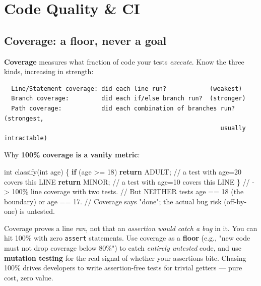\documentclass[11pt]{article}
\newenvironment{Shaded}{\begin{snugshade}}{\end{snugshade}}
\newcommand{\CommentTok}[1]{\textcolor[rgb]{0.48,0.49,0.49}{#1}}
\newcommand{\ControlFlowTok}[1]{\textcolor[rgb]{0.99,0.74,0.29}{\textbf{#1}}}
\newcommand{\DataTypeTok}[1]{\textcolor[rgb]{0.16,0.50,0.73}{#1}}
\newcommand{\DecValTok}[1]{\textcolor[rgb]{0.96,0.45,0.00}{#1}}
\newcommand{\FunctionTok}[1]{\textcolor[rgb]{0.56,0.27,0.68}{#1}}
\newcommand{\NormalTok}[1]{\textcolor[rgb]{0.81,0.81,0.76}{#1}}
\newcommand{\OperatorTok}[1]{\textcolor[rgb]{0.81,0.81,0.76}{#1}}
\begin{document}
\section{Code Quality \& CI}\label{code-quality--ci}

\subsection{Coverage: a floor, never a goal}\label{coverage-a-floor-never-a-goal}

\textbf{Coverage} measures what fraction of code your tests \emph{execute}. Know the three kinds, increasing in strength:

\setcodelang{}

\begin{verbatim}
  Line/Statement coverage: did each line run?            (weakest)
  Branch coverage:         did each if/else branch run?  (stronger)
  Path coverage:           did each combination of branches run?  (strongest,
                                                            usually intractable)
\end{verbatim}

Why \textbf{100\% coverage is a vanity metric}:


\begin{Shaded}
\begin{Highlighting}[]
\DataTypeTok{int} \FunctionTok{classify}\OperatorTok{(}\DataTypeTok{int}\NormalTok{ age}\OperatorTok{)} \OperatorTok{\{}
    \ControlFlowTok{if} \OperatorTok{(}\NormalTok{age }\OperatorTok{\textgreater{}=} \DecValTok{18}\OperatorTok{)} \ControlFlowTok{return}\NormalTok{ ADULT}\OperatorTok{;}     \CommentTok{// a test with age=20 covers this LINE}
    \ControlFlowTok{return}\NormalTok{ MINOR}\OperatorTok{;}                    \CommentTok{// a test with age=10 covers this LINE}
\OperatorTok{\}}
\CommentTok{// {-}\textgreater{} 100\% line coverage with two tests.}
\CommentTok{// But NEITHER tests age == 18 (the boundary) or age == 17.}
\CommentTok{// Coverage says "done"; the actual bug risk (off{-}by{-}one) is untested.}
\end{Highlighting}
\end{Shaded}

Coverage proves a line \emph{ran}, not that an \emph{assertion would catch a bug} in it. You can hit 100\% with zero \texttt{assert} statements. Use coverage as a \textbf{floor} (e.g., "new code must not drop coverage below 80\%") to catch \emph{entirely untested} code, and use \textbf{mutation testing} for the real signal of whether your assertions bite. Chasing 100\% drives developers to write assertion-free tests for trivial getters --- pure cost, zero value.
\end{document}

